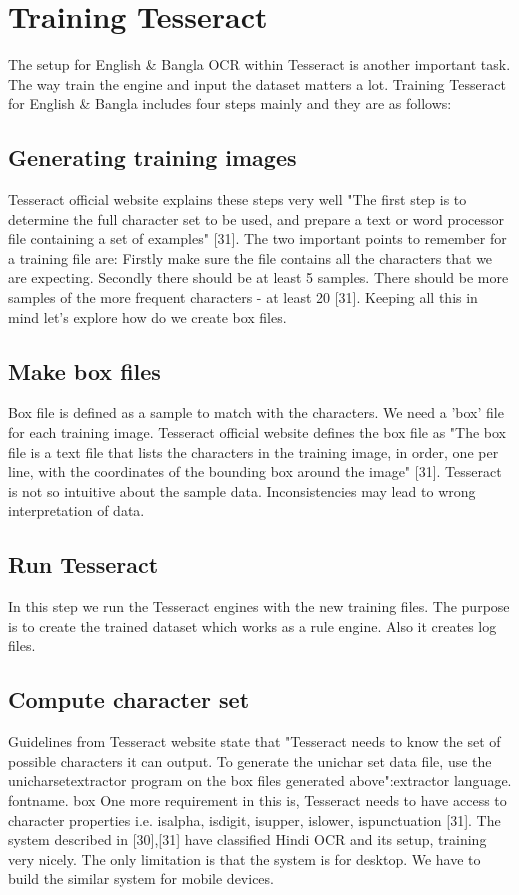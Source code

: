 \section{Training Tesseract}
The setup for English \& Bangla OCR within Tesseract is another important task. The way train the engine and input the dataset matters a lot.
Training Tesseract for English \& Bangla includes four steps mainly and they are as follows:
\subsection{Generating training images}
Tesseract official website explains these steps very well "The first step is to determine the full
character set to be used, and prepare a text or word processor file containing a set of examples"
[31]. The two important points to remember for a training file are: Firstly make sure the file
contains all the characters that we are expecting. Secondly there should be at least 5 samples.
There should be more samples of the more frequent characters - at least 20 [31]. Keeping all this
in mind let's explore how do we create box files.
\subsection{Make box files}
Box file is defined as a sample to match with the characters. We need a 'box' file for each
training image. Tesseract official website defines the box file as "The box file is a text file that
lists the characters in the training image, in order, one per line, with the coordinates of the
bounding box around the image" [31]. Tesseract is not so intuitive about the sample data.
Inconsistencies may lead to wrong interpretation of data.
\subsection{Run Tesseract}
In this step we run the Tesseract engines with the new training files. The purpose is to create the
trained dataset which works as a rule engine. Also it creates log files.
\subsection{Compute character set} 
Guidelines from Tesseract website state that "Tesseract needs to know the set of possible characters it can output. To generate the unichar set data file, use the unicharset\textunderscore extractor program on the box files generated above":extractor language. fontname. box 
One more requirement in this is, Tesseract needs to have access to character properties i.e.
isalpha, isdigit, isupper, islower, ispunctuation [31].
The system described in [30],[31] have classified Hindi OCR and its setup, training very nicely.
The only limitation is that the system is for desktop. We have to build the similar system for
mobile devices.
